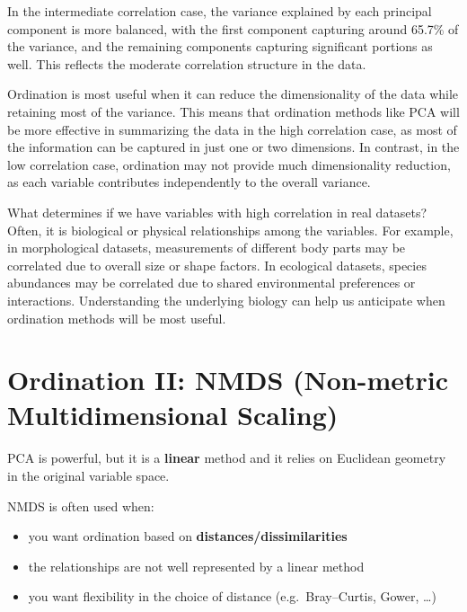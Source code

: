 \documentclass[
  letterpaper,
  8pt,
  a4paper]{book}
\providecommand{\tightlist}{%
  \setlength{\itemsep}{0pt}\setlength{\parskip}{0pt}}
\begin{document}
In the intermediate correlation case, the variance explained by each
principal component is more balanced, with the first component capturing
around 65.7\% of the variance, and the remaining components capturing
significant portions as well. This reflects the moderate correlation
structure in the data.

Ordination is most useful when it can reduce the dimensionality of the
data while retaining most of the variance. This means that ordination
methods like PCA will be more effective in summarizing the data in the
high correlation case, as most of the information can be captured in
just one or two dimensions. In contrast, in the low correlation case,
ordination may not provide much dimensionality reduction, as each
variable contributes independently to the overall variance.

What determines if we have variables with high correlation in real
datasets? Often, it is biological or physical relationships among the
variables. For example, in morphological datasets, measurements of
different body parts may be correlated due to overall size or shape
factors. In ecological datasets, species abundances may be correlated
due to shared environmental preferences or interactions. Understanding
the underlying biology can help us anticipate when ordination methods
will be most useful.

\section*{Ordination II: NMDS (Non-metric Multidimensional
Scaling)}\label{ordination-ii-nmds-non-metric-multidimensional-scaling}


PCA is powerful, but it is a \textbf{linear} method and it relies on
Euclidean geometry in the original variable space.

NMDS is often used when:

\begin{itemize}
\tightlist
\item
  you want ordination based on \textbf{distances/dissimilarities}
\item
  the relationships are not well represented by a linear method
\item
  you want flexibility in the choice of distance (e.g.~Bray--Curtis,
  Gower, \ldots)
\end{itemize}
\end{document}

